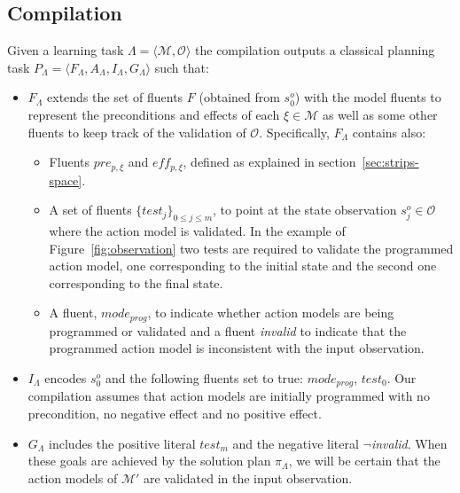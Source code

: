 \documentclass[runningheads]{llncs}
\newcommand{\tup}[1]{{\langle #1 \rangle}}
\begin{document}
\subsection{Compilation}
Given a learning task $\Lambda=\tup{\mathcal{M},{\mathcal O}}$ the compilation outputs a classical planning task $P_{\Lambda}=\tup{F_{\Lambda},A_{\Lambda},I_{\Lambda},G_{\Lambda}}$ such that:
\begin{itemize}
\item $F_{\Lambda}$ extends the set of fluents $F$ (obtained from $s_0^o$) with the model fluents to represent the preconditions and effects of each $\xi\in\mathcal{M}$ as well as some other fluents to keep track of the validation of ${\mathcal O}$. Specifically, $F_{\Lambda}$ contains also:
\begin{itemize}
\item Fluents $pre_{p,\xi}$ and $eff_{p,\xi}$, defined as explained in section~\ref{sec:strips-space}.
\item A set of fluents $\{test_j\}_{0\leq j\leq m}$, to point at the state observation $s_j^o\in {\mathcal O}$ where the action model is validated. In the example of Figure~\ref{fig:observation} two tests are required to validate the programmed action model, one corresponding to the initial state and the second one corresponding to the final state.
\item A fluent, $mode_{prog}$, to indicate whether action models are being programmed or validated and a fluent {\em invalid} to indicate that the programmed action model is inconsistent with the input observation.
\end{itemize}

\item $I_{\Lambda}$ encodes $s_0^o$ and the following fluents set to true: $mode_{prog}$, $test_0$. Our compilation assumes that action models are initially programmed with no precondition, no negative effect and no positive effect.

\item $G_{\Lambda}$ includes the positive literal $test_m$ and the negative literal $\neg${\em invalid}. When these goals are achieved by the solution plan $\pi_\Lambda$, we will be certain that the action models of $\mathcal{M'}$ are validated in the input observation.


\end{itemize}
\end{document}
